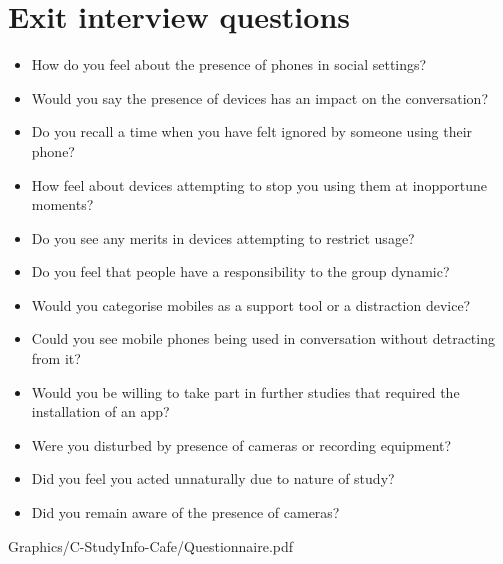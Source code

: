 


\section{Exit interview questions}\label{app:studyinfo-cafe interview}

\begin{itemize}
    \item How do you feel about the presence of phones in social settings?
    \item Would you say the presence of devices has an impact on the conversation?
    \item Do you recall a time when you have felt ignored by someone using their phone?
    \item How feel about devices attempting to stop you using them at inopportune moments?
    \item Do you see any merits in devices attempting to restrict usage?
    \item Do you feel that people have a responsibility to the group dynamic?
    \item Would you categorise mobiles as a support tool or a distraction device?
    \item Could you see mobile phones being used in conversation without detracting from it?
    \item Would you be willing to take part in further studies that required the installation of an app?
    \item Were you disturbed by presence of cameras or recording equipment?
    \item Did you feel you acted unnaturally due to nature of study?
    \item Did you remain aware of the presence of cameras?
\end{itemize}







    {Graphics/C-StudyInfo-Cafe/Questionnaire.pdf}



